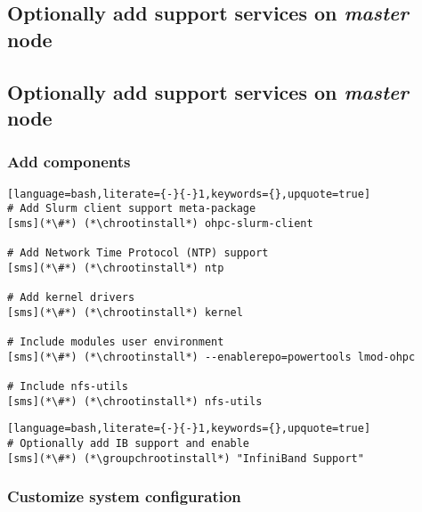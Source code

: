 \documentclass[letterpaper]{article}
\newcommand{\chrootinstall}{nodeshell compute dnf -y install}
\newcommand{\groupchrootinstall}{nodeshell compute dnf -y groupinstall}
\begin{document}
\subsection{Optionally add \InfiniBand{} support services on {\em master} node} \label{sec:add_ofed}


\subsection{Optionally add \OmniPath{} support services on {\em master} node} \label{sec:add_opa}


\vspace*{0.2cm}
\subsubsection{Add \OHPC{} components} \label{sec:add_components}


\begin{lstlisting}[language=bash,literate={-}{-}1,keywords={},upquote=true]
# Add Slurm client support meta-package
[sms](*\#*) (*\chrootinstall*) ohpc-slurm-client

# Add Network Time Protocol (NTP) support
[sms](*\#*) (*\chrootinstall*) ntp

# Add kernel drivers
[sms](*\#*) (*\chrootinstall*) kernel

# Include modules user environment
[sms](*\#*) (*\chrootinstall*) --enablerepo=powertools lmod-ohpc

# Include nfs-utils  
[sms](*\#*) (*\chrootinstall*) nfs-utils
\end{lstlisting}



\begin{lstlisting}[language=bash,literate={-}{-}1,keywords={},upquote=true]
# Optionally add IB support and enable
[sms](*\#*) (*\groupchrootinstall*) "InfiniBand Support"
\end{lstlisting}

\vspace*{-0.25cm}
\subsubsection{Customize system configuration} \label{sec:master_customization}

\end{document}
